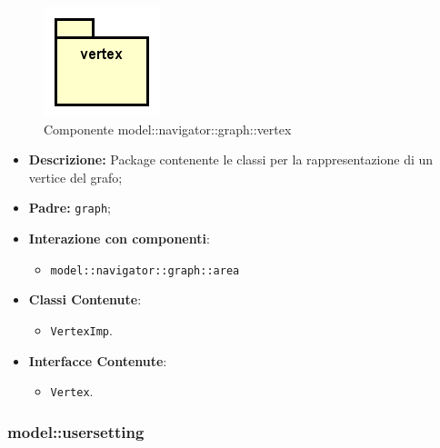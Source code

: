 \documentclass[../DefinizioneDiProdotto.tex]{subfiles}
\begin{document}
    \begin{figure}[H]
        \centering
        \includegraphics{img/package/vertex.png}
        \caption{Componente model::\-navigator::\-graph::\-vertex}\label{fig:model::navigator::graph::vertex} 
    \end{figure}
    \begin{itemize}
\item \textbf{Descrizione:} Package contenente le classi per la rappresentazione di un vertice del grafo;
\item \textbf{Padre:} \texttt{graph};
\item \textbf{Interazione con componenti}:
\begin{itemize}
\item \texttt{model::navigator::graph::area}
\end{itemize}
\item \textbf{Classi Contenute}:
\begin{itemize}
\item \texttt{VertexImp}.

\end{itemize}
\item \textbf{Interfacce Contenute}:
\begin{itemize}
\item \texttt{Vertex}.

\end{itemize}
\end{itemize}

\subsubsection{model::\-usersetting}
\end{document}
